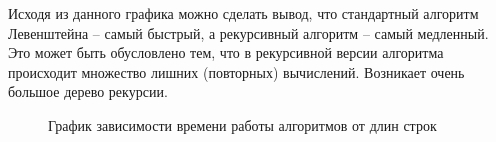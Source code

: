 \documentclass[a4paper,12pt]{article}
\begin{document}
Исходя из данного графика можно сделать вывод, что стандартный алгоритм Левенштейна – самый быстрый, а рекурсивный алгоритм – самый медленный. Это может быть обусловлено тем, что в рекурсивной версии алгоритма происходит множество лишних (повторных) вычислений. Возникает очень большое дерево рекурсии. \\
\begin{figure}[h]
\caption{График зависимости времени работы алгоритмов от длин строк}
\label{images:graphics}
\end{figure}

\newpage
\end{document}
